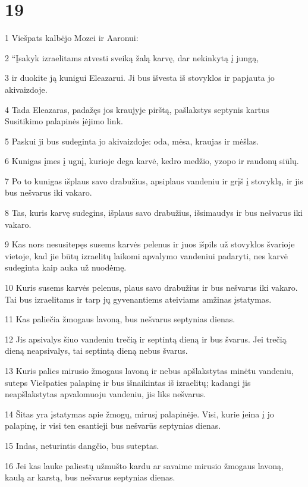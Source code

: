 \chapter{19}

\par 1 Viešpats kalbėjo Mozei ir Aaronui: 
\par 2 “Įsakyk izraelitams atvesti sveiką žalą karvę, dar nekinkytą į jungą, 
\par 3 ir duokite ją kunigui Eleazarui. Ji bus išvesta iš stovyklos ir papjauta jo akivaizdoje. 
\par 4 Tada Eleazaras, padažęs jos kraujyje pirštą, pašlakstys septynis kartus Susitikimo palapinės įėjimo link. 
\par 5 Paskui ji bus sudeginta jo akivaizdoje: oda, mėsa, kraujas ir mėšlas. 
\par 6 Kunigas įmes į ugnį, kurioje dega karvė, kedro medžio, yzopo ir raudonų siūlų. 
\par 7 Po to kunigas išplaus savo drabužius, apsiplaus vandeniu ir grįš į stovyklą, ir jis bus nešvarus iki vakaro. 
\par 8 Tas, kuris karvę sudegins, išplaus savo drabužius, išsimaudys ir bus nešvarus iki vakaro. 
\par 9 Kas nors nesusitepęs susems karvės pelenus ir juos išpils už stovyklos švarioje vietoje, kad jie būtų izraelitų laikomi apvalymo vandeniui padaryti, nes karvė sudeginta kaip auka už nuodėmę. 
\par 10 Kuris susems karvės pelenus, plaus savo drabužius ir bus nešvarus iki vakaro. Tai bus izraelitams ir tarp jų gyvenantiems ateiviams amžinas įstatymas. 
\par 11 Kas paliečia žmogaus lavoną, bus nešvarus septynias dienas. 
\par 12 Jis apsivalys šiuo vandeniu trečią ir septintą dieną ir bus švarus. Jei trečią dieną neapsivalys, tai septintą dieną nebus švarus. 
\par 13 Kuris palies mirusio žmogaus lavoną ir nebus apšlakstytas minėtu vandeniu, suteps Viešpaties palapinę ir bus išnaikintas iš izraelitų; kadangi jis neapšlakstytas apvalomuoju vandeniu, jis liks nešvarus. 
\par 14 Šitas yra įstatymas apie žmogų, mirusį palapinėje. Visi, kurie įeina į jo palapinę, ir visi ten esantieji bus nešvarūs septynias dienas. 
\par 15 Indas, neturintis dangčio, bus suteptas. 
\par 16 Jei kas lauke paliestų užmušto kardu ar savaime mirusio žmogaus lavoną, kaulą ar karstą, bus nešvarus septynias dienas. 
